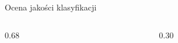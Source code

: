 \begin{frame}{Ocena jakości klasyfikacji}
\begin{columns}[T,onlytextwidth]
\begin{column}{0.68\textwidth}
\vspace{4pt}
\end{column}
\begin{column}{0.30\textwidth}
\centering{}
\end{column}
\end{columns}
\end{frame}
